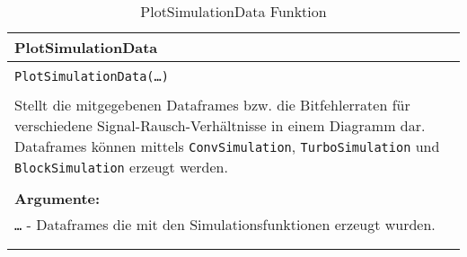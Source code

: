 \begin{longtable}{|p{\textwidth}|}
\hline
\rowcolor{lightblue}
PlotSimulationData
\\
\hline
\\
\texttt{PlotSimulationData(\dots)}\\
\\
Stellt die mitgegebenen Dataframes bzw. die Bitfehlerraten für verschiedene Signal-Rausch-Verhältnisse in einem Diagramm dar. Dataframes können mittels \texttt{ConvSimulation}, \texttt{TurboSimulation} und \texttt{BlockSimulation} erzeugt werden.\\
\\
\textbf{Argumente:}\\
\texttt{\dots} - Dataframes die mit den Simulationsfunktionen erzeugt wurden.\\	
\\
\hline
\caption{PlotSimulationData Funktion}
\end{longtable}